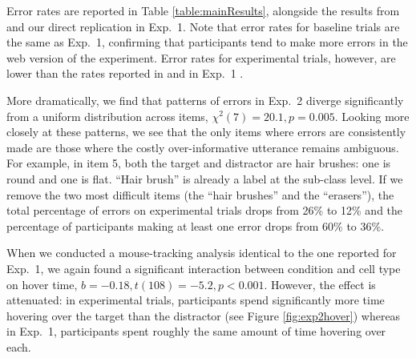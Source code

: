\documentclass[10pt,letterpaper]{article}
\begin{document}
Error rates are reported in Table \ref{table:mainResults}, alongside the results from  and our direct replication in Exp.~1. Note that error rates for baseline trials are the same as Exp.~1, confirming that participants tend to make more errors in the web version of the experiment. Error rates for experimental trials, however, are lower than the rates reported in  and in Exp.~1 . 

More dramatically, we find that patterns of errors in Exp.~2 diverge significantly from a uniform distribution across items, $\chi^2(7) = 20.1, p = 0.005$. Looking more closely at these patterns, we see that the only items where errors are consistently made are those where the costly over-informative utterance remains ambiguous. For example, in item 5, both the target and distractor are hair brushes: one is round and one is flat. ``Hair brush'' is already a label at the sub-class level. If we remove the two most difficult items (the ``hair brushes'' and the ``erasers''), the total percentage of errors on experimental trials drops from 26\% to 12\% and the percentage of participants making at least one error drops from 60\% to 36\%.


When we conducted a mouse-tracking analysis identical to the one reported for Exp.~1, we again found a significant interaction between condition and cell type on hover time, $b = -0.18, t(108) = -5.2, p < 0.001$. However, the effect is attenuated: in experimental trials, participants spend significantly more time hovering over the target than the distractor (see Figure \ref{fig:exp2hover}) whereas in Exp.~1, participants spent roughly the same amount of time hovering over each.


\end{document}
